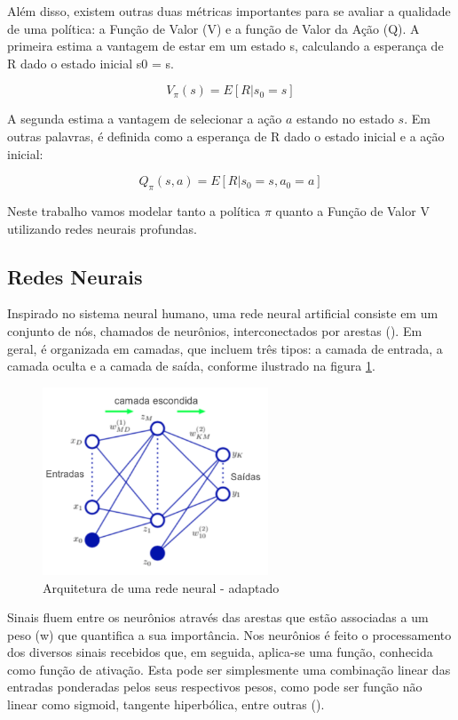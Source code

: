 Além disso, existem outras duas métricas importantes para se avaliar a qualidade de uma política: a Função de Valor (V) e a função de Valor da Ação (Q). A primeira estima a vantagem de estar em um estado s, calculando a esperança de R dado o estado inicial s0 = s. 

\begin{equation}
    V_\pi(s) = E[R|s_0 = s]
\end{equation}

A segunda estima a vantagem de selecionar a ação $a$ estando no estado $s$. Em outras palavras, é definida como a esperança de R dado o estado inicial e a ação inicial:

\begin{equation}
    Q_\pi(s,a) = E[R|s_0 = s, a_0 = a]
\end{equation}


Neste trabalho vamos modelar tanto a política $\pi$ quanto a Função de Valor V utilizando redes neurais profundas. 

\subsection{Redes Neurais}
Inspirado no sistema neural humano, uma rede neural artificial consiste em um conjunto de nós, chamados de neurônios, interconectados por arestas (\cite{Bishop}). 
Em geral, é organizada em camadas, que incluem três tipos: a camada de entrada, a camada oculta e a camada de saída, conforme ilustrado na figura \ref{arqNN}.

\begin{figure}[H]
     \centering
     \includegraphics[width=0.6\textwidth]{figuras/RedeNeural.png}
     \caption[Arquitetura de rede neural]{Arquitetura de uma rede neural - \cite{Bishop} adaptado}
     \label{arqNN}
\end{figure}

Sinais fluem entre os neurônios através das arestas que estão associadas a um peso (w) que quantifica a sua importância. 
Nos neurônios é feito o processamento dos diversos sinais recebidos que, em seguida, aplica-se uma função, conhecida como função de ativação. 
Esta pode ser simplesmente uma combinação linear das entradas ponderadas pelos seus respectivos pesos, como pode ser função não linear como  sigmoid, 
tangente hiperbólica, entre outras (\cite{Bishop}).   

